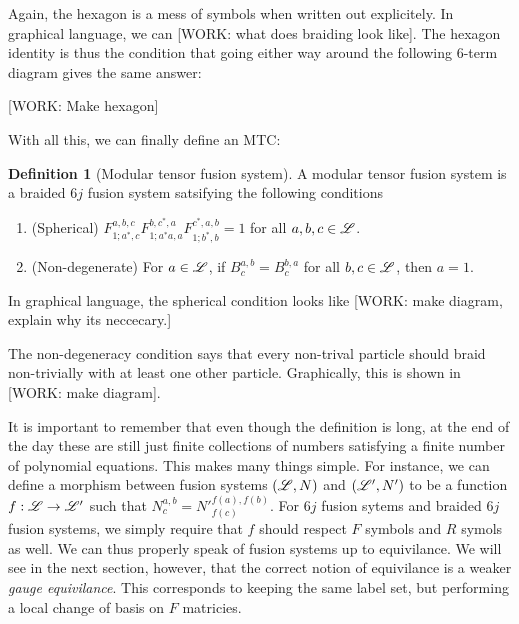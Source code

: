 \documentclass{article}
\theoremstyle{definition}
\newtheorem*{definition}{Definition}
\numberwithin{figure}{section}
\begin{document}
Again, the hexagon is a mess of symbols when written out explicitely. In graphical language, we can [WORK: what does braiding look like]. The hexagon identity is thus the condition that going either way around the following 6-term diagram gives the same answer:

[WORK: Make hexagon]

With all this, we can finally define an MTC:

\begin{definition}[Modular tensor fusion system] A modular tensor fusion system is a braided $6j$ fusion system satsifying the following conditions

\begin{enumerate}

\item (Spherical) $F^{a,b,c}_{1;a^*,c}F^{b,c^*,a}_{1;a^*a,a}F^{c^*,a,b}_{1;b^*,b}=1$ for all $a,b,c\in \mathscr{L}$.

\item (Non-degenerate) For $a\in \mathscr{L}$, if $B_c^{a,b}=B_c^{b,a}$ for all $b,c\in \mathscr{L}$, then $a=1$.
\end{enumerate}
\raggedleft\qedsymbol{}
\end{definition}

In graphical language, the spherical condition looks like [WORK: make diagram, explain why its neccecary.]

The non-degeneracy condition says that every non-trival particle should braid non-trivially with at least one other particle. Graphically, this is shown in [WORK: make diagram].

It is important to remember that even though the definition is long, at the end of the day these are still just finite collections of numbers satisfying a finite number of polynomial equations. This makes many things simple. For instance, we can define a morphism between fusion systems $(\mathscr{L},N)$ and $(\mathscr{L}',N')$ to be a function $f:\mathscr{L}\to \mathscr{L}'$ such that $N^{a,b}_{c}=N'^{f(a),f(b)}_{f(c)}$. For $6j$ fusion sytems and braided $6j$ fusion systems, we simply require that $f$ should respect $F$ symbols and $R$ symols as well. We can thus properly speak of fusion systems up to equivilance. We will see in the next section, however, that the correct notion of equivilance is a weaker \textit{gauge equivilance}. This corresponds to keeping the same label set, but performing a local change of basis on $F$ matricies.
\end{document}
